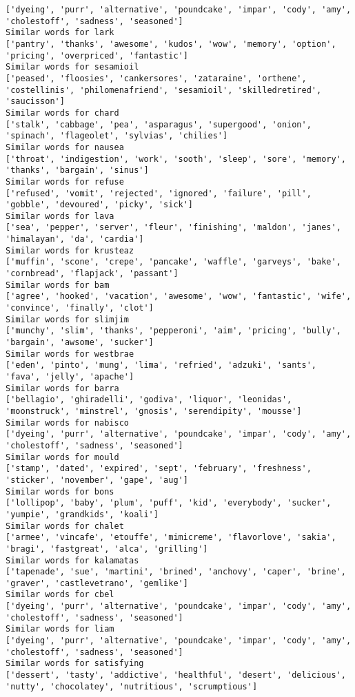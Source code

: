 \documentclass[11pt]{article}
\begin{document}
\begin{Verbatim}[commandchars=\\\{\}]
['dyeing', 'purr', 'alternative', 'poundcake', 'impar', 'cody', 'amy', 'cholestoff', 'sadness', 'seasoned']
Similar words for lark
['pantry', 'thanks', 'awesome', 'kudos', 'wow', 'memory', 'option', 'pricing', 'overpriced', 'fantastic']
Similar words for sesamioil
['peased', 'floosies', 'cankersores', 'zataraine', 'orthene', 'costellinis', 'philomenafriend', 'sesamioil', 'skilledretired', 'saucisson']
Similar words for chard
['stalk', 'cabbage', 'pea', 'asparagus', 'supergood', 'onion', 'spinach', 'flageolet', 'sylvias', 'chilies']
Similar words for nausea
['throat', 'indigestion', 'work', 'sooth', 'sleep', 'sore', 'memory', 'thanks', 'bargain', 'sinus']
Similar words for refuse
['refused', 'vomit', 'rejected', 'ignored', 'failure', 'pill', 'gobble', 'devoured', 'picky', 'sick']
Similar words for lava
['sea', 'pepper', 'server', 'fleur', 'finishing', 'maldon', 'janes', 'himalayan', 'da', 'cardia']
Similar words for krusteaz
['muffin', 'scone', 'crepe', 'pancake', 'waffle', 'garveys', 'bake', 'cornbread', 'flapjack', 'passant']
Similar words for bam
['agree', 'hooked', 'vacation', 'awesome', 'wow', 'fantastic', 'wife', 'convince', 'finally', 'clot']
Similar words for slimjim
['munchy', 'slim', 'thanks', 'pepperoni', 'aim', 'pricing', 'bully', 'bargain', 'awsome', 'sucker']
Similar words for westbrae
['eden', 'pinto', 'mung', 'lima', 'refried', 'adzuki', 'sants', 'fava', 'jelly', 'apache']
Similar words for barra
['bellagio', 'ghiradelli', 'godiva', 'liquor', 'leonidas', 'moonstruck', 'minstrel', 'gnosis', 'serendipity', 'mousse']
Similar words for nabisco
['dyeing', 'purr', 'alternative', 'poundcake', 'impar', 'cody', 'amy', 'cholestoff', 'sadness', 'seasoned']
Similar words for mould
['stamp', 'dated', 'expired', 'sept', 'february', 'freshness', 'sticker', 'november', 'gape', 'aug']
Similar words for bons
['lollipop', 'baby', 'plum', 'puff', 'kid', 'everybody', 'sucker', 'yumpie', 'grandkids', 'koali']
Similar words for chalet
['armee', 'vincafe', 'etouffe', 'mimicreme', 'flavorlove', 'sakia', 'bragi', 'fastgreat', 'alca', 'grilling']
Similar words for kalamatas
['tapenade', 'sue', 'martini', 'brined', 'anchovy', 'caper', 'brine', 'graver', 'castlevetrano', 'gemlike']
Similar words for cbel
['dyeing', 'purr', 'alternative', 'poundcake', 'impar', 'cody', 'amy', 'cholestoff', 'sadness', 'seasoned']
Similar words for liam
['dyeing', 'purr', 'alternative', 'poundcake', 'impar', 'cody', 'amy', 'cholestoff', 'sadness', 'seasoned']
Similar words for satisfying
['dessert', 'tasty', 'addictive', 'healthful', 'desert', 'delicious', 'nutty', 'chocolatey', 'nutritious', 'scrumptious']

\end{Verbatim}
\end{document}
